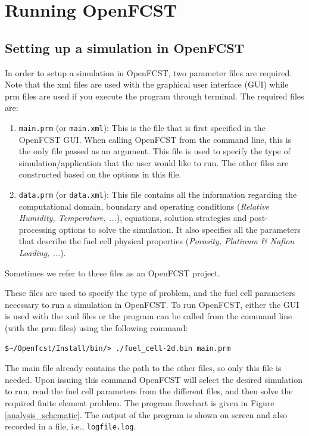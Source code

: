 \chapter{Running OpenFCST} \label{Ch:running_openFCST}

\section{Setting up a simulation in OpenFCST}

In order to setup a simulation in OpenFCST, two parameter files are required. Note that the xml files are used with the graphical user interface (GUI) while prm files are used if you execute the program through terminal. The required files are:
\begin{enumerate}
 \item \texttt{main.prm} (or \texttt{main.xml}): This is the file that is first specified in the OpenFCST GUI. When calling OpenFCST from the command line, this is the only file passed as an argument. This file is used to specify the type of simulation/application that the user would like to run. The other files are constructed based on the options in this file.
 \item \texttt{data.prm} (or \texttt{data.xml}): This file contains all the information regarding the computational domain, boundary and operating conditions (\textit{Relative Humidity, Temperature, ...}), equations, solution strategies and post-processing options to solve the simulation. It also specifies all the parameters that describe the fuel cell physical properties (\textit{Porosity, Platinum \& Nafion Loading, ...}).
\end{enumerate}
Sometimes we refer to these files as an OpenFCST project.

These files are used to specify the type of problem, and the fuel cell parameters necessary to run a simulation in OpenFCST. To run OpenFCST, either the GUI is used with the xml files or the program can be called from the command line (with the prm files) using the following command:
\begin{lstlisting}
$~/Openfcst/Install/bin/> ./fuel_cell-2d.bin main.prm
\end{lstlisting}
The main file already contains the path to the other files, so only this file is needed. Upon issuing this command OpenFCST will select the desired simulation to run, read the fuel cell parameters from the different files, and then solve the required finite element problem. The program flowchart is given in Figure \ref{analysis_schematic}. The output of the program is shown on screen and also recorded in a file, i.e., \texttt{logfile.log}.

